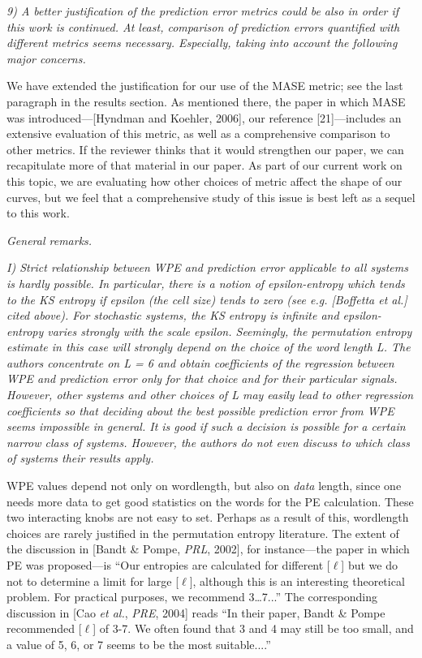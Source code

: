 \documentclass[12pt]{article}
\begin{document}
\emph{9) A better justification of the prediction error metrics could
  be also in order if this work is continued. At least, comparison of
  prediction errors quantified with different metrics seems
  necessary. Especially, taking into account the following major
  concerns.}

We have extended the justification for our use of the MASE metric; see
the last paragraph in the results section.  As mentioned there, the
paper in which MASE was introduced---[Hyndman and Koehler, 2006], our
reference [21]---includes an extensive evaluation of this metric, as
well as a comprehensive comparison to other metrics.  If the reviewer
thinks that it would strengthen our paper, we can recapitulate more of
that material in our paper.  As part of our current work on this
topic, we are evaluating how other choices of metric affect the shape
of our curves, but we feel that a comprehensive study of this issue is
best left as a sequel to this work.

\smallskip

\noindent\emph{General remarks.}

\emph{I) Strict relationship between WPE and prediction error
  applicable to all systems is hardly possible. In particular, there
  is a notion of epsilon-entropy which tends to the KS entropy if
  epsilon (the cell size) tends to zero (see e.g.  [Boffetta et al.]
  cited above). For stochastic systems, the KS entropy is infinite and
  epsilon-entropy varies strongly with the scale epsilon. Seemingly,
  the permutation entropy estimate in this case will strongly depend
  on the choice of the word length L. The authors concentrate on L = 6
  and obtain coefficients of the regression between WPE and prediction
  error only for that choice and for their particular
  signals. However, other systems and other choices of L may easily
  lead to other regression coefficients so that deciding about the
  best possible prediction error from WPE seems impossible in
  general. It is good if such a decision is possible for a certain
  narrow class of systems. However, the authors do not even discuss to
  which class of systems their results apply.}

WPE values depend not only on wordlength, but also on \emph{data}
length, since one needs more data to get good statistics on the words
for the PE calculation.  These two interacting knobs are not easy to
set.  Perhaps as a result of this, wordlength choices are rarely
justified in the permutation entropy literature.  The extent of the
discussion in [Bandt \& Pompe, {\sl PRL}, 2002], for instance---the
paper in which PE was proposed---is ``Our entropies are calculated for
different [$\ell$] but we do not to determine a limit for large
[$\ell$], although this is an interesting theoretical problem. For
practical purposes, we recommend 3\dots7...''  The corresponding
discussion in [Cao {\sl et al.}, {\sl PRE}, 2004] reads ``In their
paper, Bandt \& Pompe recommended [$\ell$] of 3-7.  We often found
that 3 and 4 may still be too small, and a value of 5, 6, or 7 seems
to be the most suitable....''
\end{document}
